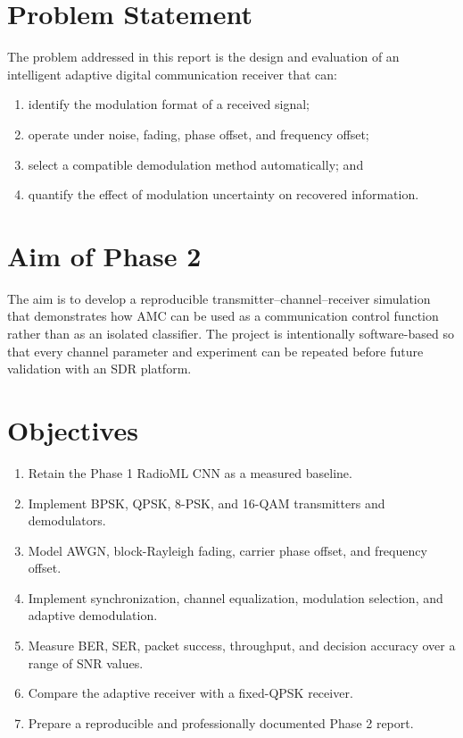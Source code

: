 \section{Problem Statement}
The problem addressed in this report is the design and evaluation of an
intelligent adaptive digital communication receiver that can:
\begin{enumerate}
\item identify the modulation format of a received signal;
\item operate under noise, fading, phase offset, and frequency offset;
\item select a compatible demodulation method automatically; and
\item quantify the effect of modulation uncertainty on recovered information.
\end{enumerate}

\section{Aim of Phase 2}
The aim is to develop a reproducible transmitter--channel--receiver
simulation that demonstrates how AMC can be used as a communication control
function rather than as an isolated classifier. The project is intentionally
software-based so that every channel parameter and experiment can be repeated
before future validation with an SDR platform.

\section{Objectives}
\begin{enumerate}
\item Retain the Phase 1 RadioML CNN as a measured baseline.
\item Implement BPSK, QPSK, 8-PSK, and 16-QAM transmitters and demodulators.
\item Model AWGN, block-Rayleigh fading, carrier phase offset, and frequency
      offset.
\item Implement synchronization, channel equalization, modulation selection,
      and adaptive demodulation.
\item Measure BER, SER, packet success, throughput, and decision accuracy over
      a range of SNR values.
\item Compare the adaptive receiver with a fixed-QPSK receiver.
\item Prepare a reproducible and professionally documented Phase 2 report.
\end{enumerate}


